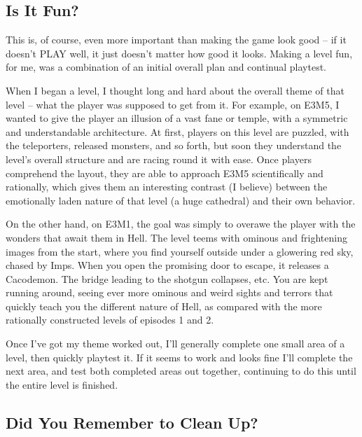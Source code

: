 \subsection{Is It Fun?}


This is, of course, even more important than making the game look good -- if it doesn't PLAY well, it just doesn't matter how good it looks. Making a level fun, for me, was a combination of an initial overall plan and continual playtest.\\
\par
 When I began a level, I thought long and hard about the overall theme of that level -- what the player was supposed to get from it. For example, on E3M5, I wanted to give the player an illusion of a vast fane or temple, with a symmetric and understandable architecture. At first, players on this level are puzzled, with the teleporters, released monsters, and so forth, but soon they understand the level's overall structure and are racing round it with ease. Once players comprehend the layout, they are able to approach E3M5 scientifically and rationally, which gives them an interesting contrast (I believe) between the emotionally laden nature of that level (a huge cathedral) and their own behavior.\\
 \par
  On the other hand, on E3M1, the goal was simply to overawe the player with the wonders that await them in Hell. The level teems with ominous and frightening images from the start, where you find yourself outside under a glowering red sky, chased by Imps. When you open the promising door to escape, it releases a Cacodemon. The bridge leading to the shotgun collapses, etc. You are kept running around, seeing ever more ominous and weird sights and terrors that quickly teach you the different nature of Hell, as compared with the more rationally constructed levels of episodes 1 and 2.\\
  \par
   Once I've got my theme worked out, I'll generally complete one small area of a level, then quickly playtest it. If it seems to work and looks fine I'll complete the next area, and test both completed areas out together, continuing to do this until the entire level is finished.\\
   \par
    \subsection{Did You Remember to Clean Up?} 

